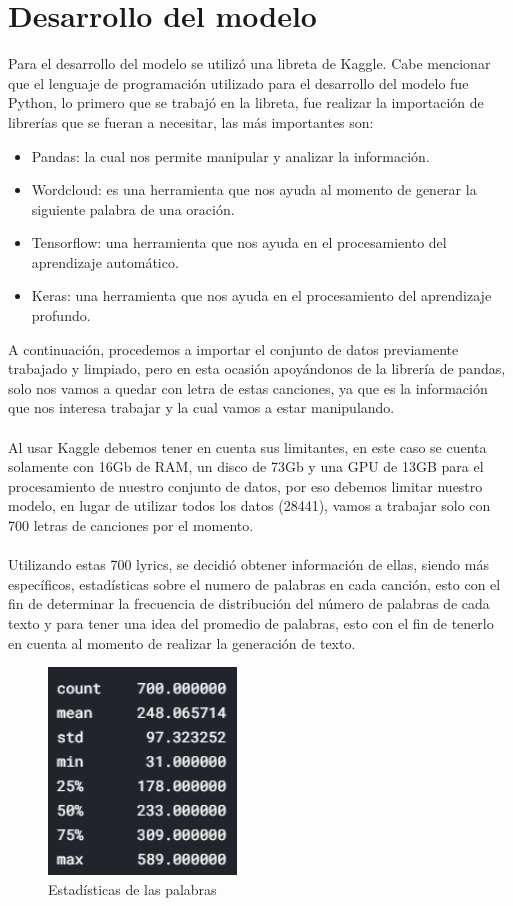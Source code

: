 \documentclass[12pt, a4paper, titlepage]{article}
\begin{document}
	\section{Desarrollo del modelo}
	Para el desarrollo del modelo se utilizó una libreta de Kaggle. Cabe mencionar que el lenguaje de programación utilizado para el desarrollo del modelo fue Python, lo primero que se trabajó en la libreta, fue realizar la importación de librerías que se fueran a necesitar, las más importantes son:	
	\begin{itemize}
		\item Pandas: la cual nos permite manipular y analizar la información.
		\item Wordcloud: es una herramienta que nos ayuda al momento de generar la siguiente palabra de una oración.
		\item Tensorflow: una herramienta que nos ayuda en el procesamiento del aprendizaje automático.
		\item Keras: una herramienta que nos ayuda en el procesamiento del aprendizaje profundo.
	\end{itemize}
	A continuación, procedemos a importar el conjunto de datos previamente trabajado y limpiado, pero en esta ocasión apoyándonos de la librería de pandas, solo nos vamos a quedar con letra de estas canciones, ya que es la información que nos interesa trabajar y la cual vamos a estar manipulando.\\\\
	Al usar Kaggle debemos tener en cuenta sus limitantes, en este caso se cuenta solamente con 16Gb de RAM, un disco de 73Gb y una GPU de 13GB para el procesamiento de nuestro conjunto de datos, por eso debemos limitar nuestro modelo, en lugar de utilizar todos los datos (28441), vamos a trabajar solo con 700 letras de canciones por el momento.\\\\
	Utilizando estas 700 lyrics, se decidió obtener información de ellas, siendo más específicos, estadísticas sobre el numero de palabras en cada canción, esto con el fin de determinar la frecuencia de distribución del número de palabras de cada texto y para tener una idea del promedio de palabras, esto con el fin de tenerlo en cuenta al momento de realizar la generación de texto.
	\begin{figure}[H]
		\includegraphics[width=5cm]{./Imagenes/Modelo/estadistica.png}
		\centering 
		\caption{Estadísticas de las palabras}
	\end{figure}
\end{document}
